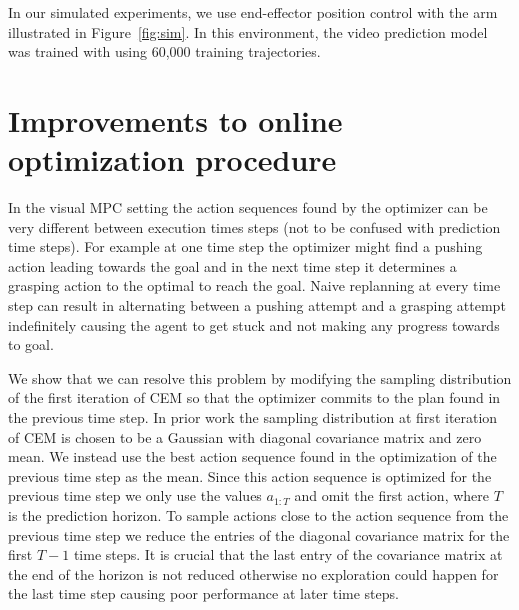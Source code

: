 In our simulated experiments, we use end-effector position control with the arm illustrated in Figure~\ref{fig:sim}. In this environment, the video prediction model was trained with using 60,000 training trajectories.


\section*{Improvements to online optimization procedure}


In the visual MPC setting the action sequences found by the optimizer can be very different between execution times steps (not to be confused with prediction time steps). For example at one time step the optimizer might find a pushing action leading towards the goal and in the next time step it determines a grasping action to the optimal to reach the goal. Naive replanning at every time step can result in alternating between a pushing attempt and a grasping attempt indefinitely causing the agent to get stuck and not making any progress towards to goal. 

We show that we can resolve this problem by modifying the sampling distribution of the first iteration of CEM so that the optimizer commits to the plan found in the previous time step. In prior work \cite{sna} the sampling distribution at first iteration of CEM is chosen to be a Gaussian with diagonal covariance matrix and zero mean. We instead use the best action sequence found in the optimization of the previous time step as the mean. Since this action sequence is optimized for the previous time step we only use the values $a_{1:T}$ and omit the first action, where $T$ is the prediction horizon. To sample actions close to the action sequence from the previous time step we reduce the entries of the diagonal covariance matrix for the first $T-1$ time steps. It is crucial that the last entry of the covariance matrix at the end of the horizon is not reduced otherwise no exploration could happen for the last time step causing poor performance at later time steps.